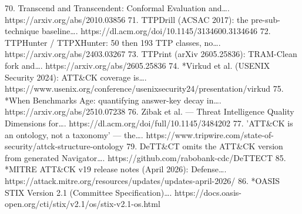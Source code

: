 \documentclass[11pt,a4paper]{article}
\begin{document}
70. Transcend and Transcendent: Conformal Evaluation and…. https://arxiv.org/abs/2010.03856
71. TTPDrill (ACSAC 2017): the pre-sub-technique baseline…. https://dl.acm.org/doi/10.1145/3134600.3134646
72. TTPHunter / TTPXHunter: 50 then 193 TTP classes, no…. https://arxiv.org/abs/2403.03267
73. TTPrint (arXiv 2605.25836): TRAM-Clean fork and…. https://arxiv.org/abs/2605.25836
74. *Virkud et al. (USENIX Security 2024): ATT\&CK coverage is…. https://www.usenix.org/conference/usenixsecurity24/presentation/virkud
75. *When Benchmarks Age: quantifying answer-key decay in…. https://arxiv.org/abs/2510.07238
76. Zibak et al. — Threat Intelligence Quality Dimensions for…. https://dl.acm.org/doi/full/10.1145/3484202
77. 'ATT\&CK is an ontology, not a taxonomy' — the…. https://www.tripwire.com/state-of-security/attck-structure-ontology
79. DeTT\&CT omits the ATT\&CK version from generated Navigator…. https://github.com/rabobank-cdc/DeTTECT
85. *MITRE ATT\&CK v19 release notes (April 2026): Defense…. https://attack.mitre.org/resources/updates/updates-april-2026/
86. *OASIS STIX Version 2.1 (Committee Specification)…. https://docs.oasis-open.org/cti/stix/v2.1/os/stix-v2.1-os.html
\end{document}
